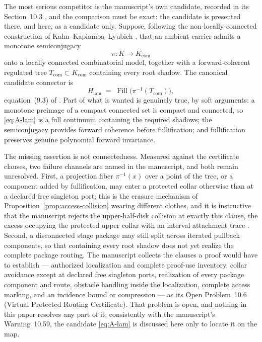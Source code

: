 \documentclass[11pt,reqno]{amsart}
\theoremstyle{definition}
\theoremstyle{remark}
\newcommand{\Fill}{\operatorname{Fill}}
\begin{document}
The most serious competitor is the manuscript's own candidate, recorded
in its Section~10.3 \cite{MWman}, and the comparison must be exact:
the candidate is presented there, and here, as a candidate only.
Suppose, following the non-locally-connected construction of
Kahn--Kapiamba--Lyubich \cite{KKL26}, that an ambient carrier admits a
monotone semiconjugacy
\[
\pi\colon K\longrightarrow K_{\mathrm{com}}
\]
onto a locally connected combinatorial model, together with a
forward-coherent regulated tree $T_{\mathrm{com}}\subset K_{\mathrm{com}}$
containing every root shadow.  The canonical candidate connector is
\begin{equation}\label{eq:A-lam}
H_{\mathrm{lam}}\;=\;\Fill\bigl(\pi^{-1}(T_{\mathrm{com}})\bigr),
\end{equation}
equation~(9.3) of \cite{MWman}.  Part of what is wanted is genuinely
true, by soft arguments: a monotone preimage of a compact connected set
is compact and connected, so \eqref{eq:A-lam} is a full continuum
containing the required shadows; the semiconjugacy provides forward
coherence before fullification; and fullification preserves genuine
polynomial forward invariance.

The missing assertion is not connectedness.  Measured against the
certificate clauses, two failure channels are named in the manuscript,
and both remain unresolved.  First, a projection fiber
$\pi^{-1}(x)$ over a point of the tree, or a component added by
fullification, may enter a protected collar otherwise than at a declared
free singleton port; this is the erasure mechanism of
Proposition~\ref{prop:access-collision} wearing different clothes, and
it is instructive that the manuscript rejects the upper-half-disk
collision at exactly this clause, the excess occupying the protected
upper collar with an interval attachment trace \cite{MWman}.  Second, a
disconnected stage package may still split across iterated pullback
components, so that containing every root shadow does not yet realize
the complete package routing.  The manuscript collects the clauses a
proof would have to establish --- authorized localization and complete
proof-use inventory, collar avoidance except at declared free singleton
ports, realization of every package component and route, obstacle
handling inside the localization, complete access marking, and an
incidence bound or compression --- as its Open Problem~10.6 (Virtual
Protected Routing Certificate).  That problem is open, and nothing in
this paper resolves any part of it; consistently with the manuscript's
Warning~10.59, the candidate \eqref{eq:A-lam} is discussed here only to
locate it on the map.
\end{document}
